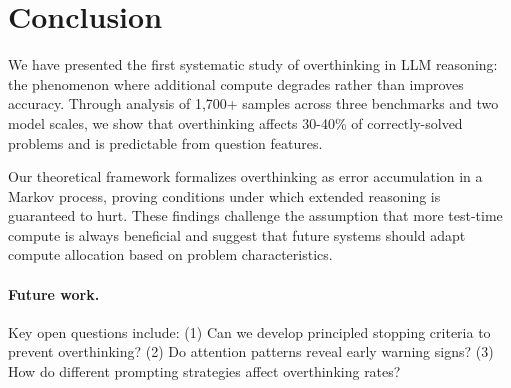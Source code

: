 \section{Conclusion}

We have presented the first systematic study of overthinking in LLM reasoning: the phenomenon where additional compute degrades rather than improves accuracy.
Through analysis of 1,700+ samples across three benchmarks and two model scales, we show that overthinking affects 30-40\% of correctly-solved problems and is predictable from question features.

Our theoretical framework formalizes overthinking as error accumulation in a Markov process, proving conditions under which extended reasoning is guaranteed to hurt.
These findings challenge the assumption that more test-time compute is always beneficial and suggest that future systems should adapt compute allocation based on problem characteristics.

\paragraph{Future work.}
Key open questions include: (1) Can we develop principled stopping criteria to prevent overthinking? (2) Do attention patterns reveal early warning signs? (3) How do different prompting strategies affect overthinking rates?

